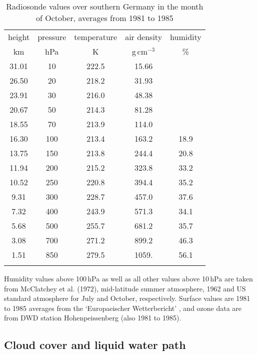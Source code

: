 \documentclass[agp]{svjour}
\begin{document}
\begin{appendix}
\begin{table}[b]
\caption[]{Radiosonde values over southern Germany in the month of
October, averages from 1981 to 1985}
\begin{tabular*}{84.22mm}{@{\hspace{0pt}\extracolsep{\fill}}ccccc@{\hspace{0pt}}}
\hline
\noalign{\smallskip}
height & pressure & temperature & air density & humidity \\
km & hPa & K & g\,cm$^{-3}$ & \% \\
\noalign{\smallskip}
\hline
\noalign{\smallskip}
31.01 & \phantom{1}10 & 222.5 & 15.66 & \\
26.50 & \phantom{1}20 & 218.2 & 31.93 & \\
23.91 & \phantom{1}30 & 216.0 & 48.38 & \\
20.67 & \phantom{1}50 & 214.3 & 81.28 & \\
18.55 & \phantom{1}70 & 213.9 & 114.0 & \\
16.30 & 100 & 213.4 & 163.2 & 18.9 \\
13.75 & 150 & 213.8 & 244.4 & 20.8 \\
11.94 & 200 & 215.2 & 323.8 & 33.2 \\
10.52 & 250 & 220.8 & 394.4 & 35.2 \\
\phantom{1}9.31 & 300 & 228.7 & 457.0 & 37.6 \\
\phantom{1}7.32 & 400 & 243.9 & 571.3 & 34.1 \\
\phantom{1}5.68 & 500 & 255.7 & 681.2 & 35.7 \\
\phantom{1}3.08 & 700 & 271.2 & 899.2 & 46.3 \\
\phantom{1}1.51 & 850 & 279.5 & 1059. & 56.1 \\
\noalign{\smallskip}
\hline
\end{tabular*}
\label{tab:10}
\end{table}

Humidity values above 100\,hPa as well as all other values above 10\,hPa
are taken from McClatchey et al. (1972), mid-latitude summer atmosphere,
1962 and US standard atmosphere for July and October, respectively.
Surface values are 1981 to 1985 averages from the `Europaeischer
Wetterbericht' \citep{DWD}, and ozone data are from DWD station
Hohenpeissenberg (also 1981 to 1985).

\subsection*{Cloud cover and liquid water path}


\end{appendix}
\end{document}
